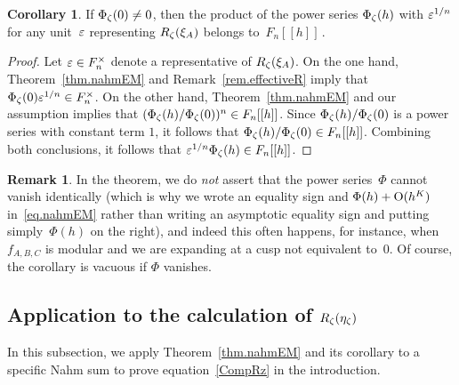 \documentclass[12pt,reqno]{amsart}
\theoremstyle{definition}
\newtheorem{remark}[theorem]{Remark}
\newtheorem{corollary}[theorem]{Corollary}
\def\nn{n}
\begin{document}

\begin{corollary}
\label{UnitCor} 
If $\Phi_\zeta(0) \neq 0$, then
the product of the power series $\Phi_\zeta(h)$ with $\varepsilon^{1/n}$ for
any unit~$\varepsilon$ representing $R_\zeta(\xi_A)$ belongs to~$F_\nn[[h]]\,$.
\end{corollary}

\begin{proof}
Let $\ve \in F_\nn^\times$ denote a representative of $R_\zeta(\xi_A)$. 
On the one hand, Theorem~\ref{thm.nahmEM} and Remark~\ref{rem.effectiveR} 
imply that $\Phi_\z(0) \ve^{1/n} \in F_\nn^\times$. 
On the other hand, Theorem~\ref{thm.nahmEM}
and our assumption implies that 
$(\Phi_\z(h)/\Phi_\z(0))^n \in F_\nn[[h]]$. Since
$\Phi_\zeta(h)/\Phi_\zeta(0)$ is a power series with constant term $1$, it
follows that $\Phi_\z(h)/\Phi_\z(0) \in F_\nn[[h]]$. Combining both
conclusions, it follows that $\ve^{1/n} \Phi_\z(h) \in F_\nn[[h]]$.
\end{proof}

\begin{remark} 
In the theorem, we do {\it not} assert that the 
power series~$\Phi$ cannot vanish identically (which is why we wrote an 
equality sign and $\Phi(h)+\text O(h^K)$ in~\eqref{eq.nahmEM} rather than 
writing an asymptotic equality sign and putting simply~$\Phi(h)$ on the 
right), and indeed this often happens, for instance, when $f_{A,B,C}$ is 
modular and we are expanding at a cusp not equivalent to~0. Of course, 
the corollary is vacuous if $\Phi$ vanishes.
\end{remark} 

\subsection{Application to the calculation of 
\texorpdfstring{$R_\zeta(\eta_\zeta)$}{Rz}}
\label{sub.ag}


In this subsection, we apply Theorem~\ref{thm.nahmEM} and its corollary to a 
specific Nahm sum to prove equation~\eqref{CompRz} in the introduction.
\end{document}
